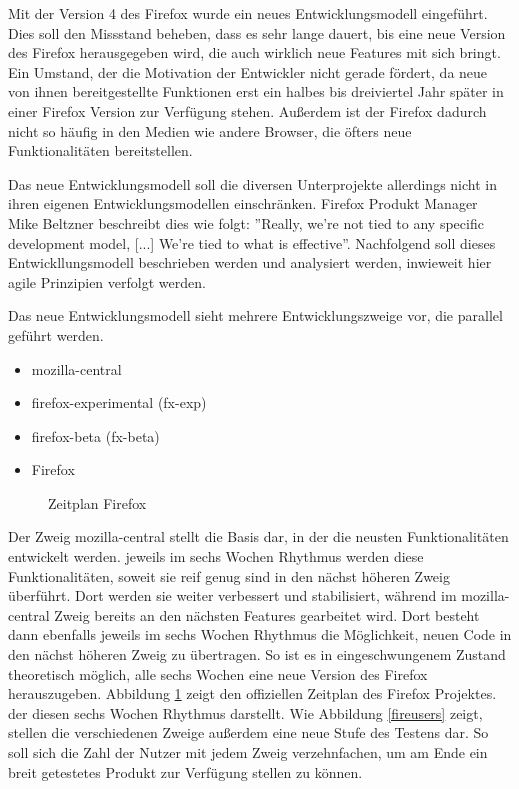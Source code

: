 Mit der Version 4 des Firefox wurde ein neues Entwicklungsmodell eingeführt. Dies soll den Missstand beheben, dass es sehr lange dauert, bis eine neue Version des Firefox herausgegeben wird, die auch wirklich neue Features mit sich bringt. Ein Umstand, der die Motivation der Entwickler nicht gerade fördert, da neue von ihnen bereitgestellte Funktionen erst ein halbes bis dreiviertel Jahr später in einer Firefox Version zur Verfügung stehen. Außerdem ist der Firefox dadurch nicht so häufig in den Medien wie andere Browser, die öfters neue Funktionalitäten bereitstellen.

Das neue Entwicklungsmodell soll die diversen Unterprojekte allerdings nicht in ihren eigenen Entwicklungsmodellen einschränken. Firefox Produkt Manager Mike Beltzner beschreibt dies wie folgt: ''Really, we're not tied to any specific development model, [...] We're tied to what is effective''\cite{bib:beltzner}. Nachfolgend soll dieses Entwickllungsmodell beschrieben werden und analysiert werden, inwieweit hier agile Prinzipien verfolgt werden.

Das neue Entwicklungsmodell sieht mehrere Entwicklungszweige vor, die pa\-ra\-llel geführt werden.
\begin{itemize}
\item mozilla-central
\item firefox-experimental (fx-exp)
\item firefox-beta (fx-beta)
\item Firefox
\end{itemize}
\begin{figure}[h]
	\centering
	\caption{Zeitplan Firefox\cite{bib:fire-development}}
	\label{firett}
\end{figure}

Der Zweig mozilla-central stellt die Basis dar, in der die neusten Funktionalitäten entwickelt werden. jeweils im sechs Wochen Rhythmus werden diese Funktionalitäten, soweit sie reif genug sind in den nächst höheren Zweig überführt. Dort werden sie weiter verbessert und stabilisiert, während im mozilla-central Zweig bereits an den nächsten Features gearbeitet wird. Dort besteht dann ebenfalls jeweils im sechs Wochen Rhythmus die Möglichkeit, neuen Code in den nächst höheren Zweig zu übertragen. So ist es in eingeschwungenem Zustand theoretisch möglich,  alle sechs Wochen eine neue Version des Firefox herauszugeben. Abbildung \ref{firett} zeigt den offiziellen Zeitplan des Firefox Projektes. der diesen sechs Wochen Rhythmus darstellt. Wie Abbildung \ref{fireusers} zeigt, stellen die verschiedenen Zweige außerdem eine neue Stufe des Testens dar. So soll sich die Zahl der Nutzer mit jedem Zweig verzehnfachen, um am Ende ein breit getestetes Produkt zur Verfügung stellen zu können.

